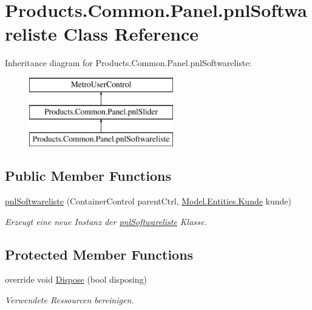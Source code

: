 \hypertarget{class_products_1_1_common_1_1_panel_1_1pnl_softwareliste}{}\section{Products.\+Common.\+Panel.\+pnl\+Softwareliste Class Reference}
\label{class_products_1_1_common_1_1_panel_1_1pnl_softwareliste}
Inheritance diagram for Products.\+Common.\+Panel.\+pnl\+Softwareliste\+:\begin{figure}[H]
\begin{center}
\leavevmode
\includegraphics[height=3.000000cm]{class_products_1_1_common_1_1_panel_1_1pnl_softwareliste}
\end{center}
\end{figure}
\subsection*{Public Member Functions}
\begin{DoxyCompactItemize}
\item 
\hyperlink{class_products_1_1_common_1_1_panel_1_1pnl_softwareliste_a4874b0627a8a2e0a4b9a3dc9898381a3}{pnl\+Softwareliste} (Container\+Control parent\+Ctrl, \hyperlink{class_products_1_1_model_1_1_entities_1_1_kunde}{Model.\+Entities.\+Kunde} kunde)
\begin{DoxyCompactList}\small\item\em Erzeugt eine neue Instanz der \hyperlink{class_products_1_1_common_1_1_panel_1_1pnl_softwareliste}{pnl\+Softwareliste} Klasse. \end{DoxyCompactList}\end{DoxyCompactItemize}
\subsection*{Protected Member Functions}
\begin{DoxyCompactItemize}
\item 
override void \hyperlink{class_products_1_1_common_1_1_panel_1_1pnl_softwareliste_aa4c1da15022ca49828c8b82a10d60ed9}{Dispose} (bool disposing)
\begin{DoxyCompactList}\small\item\em Verwendete Ressourcen bereinigen. \end{DoxyCompactList}\end{DoxyCompactItemize}
